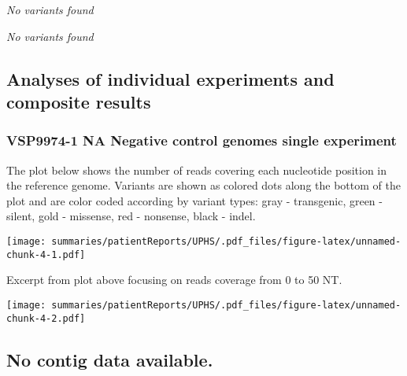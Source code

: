 \documentclass[12pt,]{article}
\begin{document}
\vspace{0.5cm}

\emph{No variants found}

\newpage

\emph{No variants found}

\newpage

\subsection{Analyses of individual experiments and composite
results}\label{analyses-of-individual-experiments-and-composite-results}

\subsubsection{VSP9974-1 \textbar{} NA \textbar{} Negative control
\textbar{} \textbar{} genomes \textbar{} single
experiment}\label{vsp9974-1-na-negative-control-genomes-single-experiment}

The plot below shows the number of reads covering each nucleotide
position in the reference genome. Variants are shown as colored dots
along the bottom of the plot and are color coded according by variant
types: gray - transgenic, green - silent, gold - missense, red -
nonsense, black - indel.

\vspace{0.23cm}

\texttt{[image: summaries/patientReports/UPHS/.pdf\_files/figure-latex/unnamed-chunk-4-1.pdf]}

\vspace{0.35cm}

\vspace{0.25cm} Excerpt from plot above focusing on reads coverage from
0 to 50 NT.

\vspace{0.25cm}

\texttt{[image: summaries/patientReports/UPHS/.pdf\_files/figure-latex/unnamed-chunk-4-2.pdf]}

\vspace{0.50cm}

\subsection{No contig data available.}\label{no-contig-data-available.}

\vspace{0.50cm}

\newpage
\end{document}
